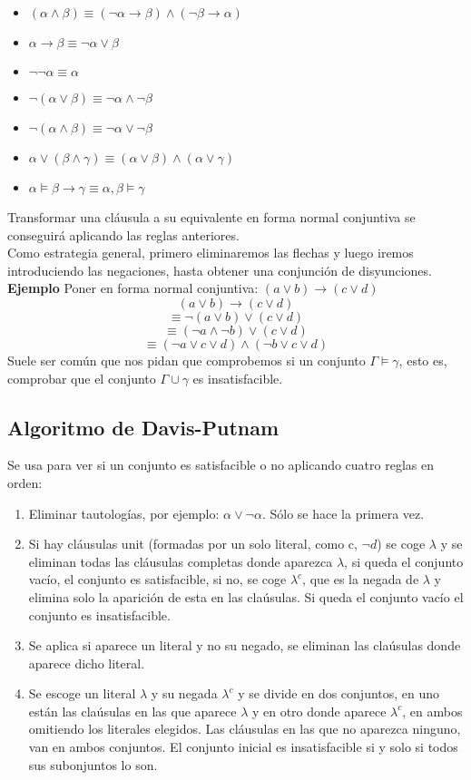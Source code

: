 \documentclass[a4paper]{article}
\begin{document}
\begin{itemize}
\item $(\alpha\land\beta)\equiv(\neg\alpha\rightarrow\beta)\land(\neg\beta\rightarrow\alpha)$
\item $\alpha\rightarrow\beta\equiv\neg\alpha\lor\beta$
\item $\neg\neg\alpha\equiv\alpha$
\item $\neg(\alpha\lor\beta)\equiv\neg\alpha\land\neg\beta$
\item $\neg(\alpha\land\beta)\equiv\neg\alpha\lor\neg\beta$
\item $\alpha\lor(\beta\land\gamma)\equiv(\alpha\lor\beta)\land(\alpha\lor\gamma)$
\item $\alpha\models\beta\rightarrow\gamma\equiv\alpha,\beta\models\gamma$
\end{itemize}
Transformar una cláusula a su equivalente en forma normal conjuntiva se conseguirá aplicando las reglas anteriores.\\
Como estrategia general, primero eliminaremos las flechas y luego iremos introduciendo las negaciones, hasta obtener una conjunción de disyunciones.\\
\large{\textbf{Ejemplo}}
Poner en forma normal conjuntiva: $(a\lor b)\rightarrow(c\lor d)$
$$(a\lor b)\rightarrow(c\lor d)$$
$$\equiv\neg(a\lor b)\lor (c\lor d)$$
$$\equiv (\neg a \land \neg b)\lor(c \lor d)$$
$$\equiv (\neg a\lor c\lor d) \land (\neg b\lor c \lor d)$$
Suele ser común que nos pidan que comprobemos si un conjunto $\Gamma\models\gamma$, esto es, comprobar que el conjunto $\Gamma\cup\gamma$ es insatisfacible.

\subsection{Algoritmo de Davis-Putnam}
Se usa para ver si un conjunto es satisfacible o no aplicando cuatro reglas en orden:
\begin{enumerate}[I]
\item Eliminar tautologías, por ejemplo: $\alpha\lor\neg\alpha$. Sólo se hace la primera vez.
\item Si hay cláusulas unit (formadas por un solo literal, como c, $\neg d$) se coge $\lambda$ y se eliminan todas las cláusulas completas donde aparezca $\lambda$, si queda el conjunto vacío, el conjunto es satisfacible, si no, se coge $\lambda^c$, que es la negada de $\lambda$ y elimina solo la aparición de esta en las claúsulas. Si queda el conjunto vacío el conjunto es insatisfacible.
\item Se aplica si aparece un literal y no su negado, se eliminan las claúsulas donde aparece dicho literal.
\item Se escoge un literal $\lambda$ y su negada $\lambda^c$ y se divide en dos conjuntos, en uno están las claúsulas en las que aparece $\lambda$ y en otro donde aparece $\lambda^c$, en ambos omitiendo los literales elegidos. Las cláusulas en las que no aparezca ninguno, van en ambos conjuntos. El conjunto inicial es insatisfacible si y solo si todos sus subonjuntos lo son.
\end{enumerate}
\end{document}
